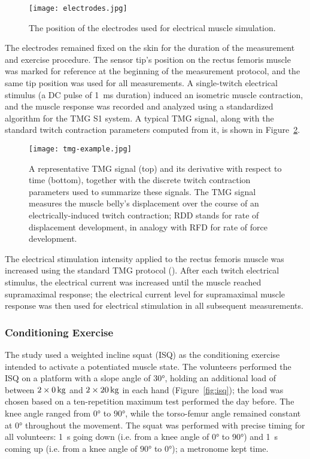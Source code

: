 \documentclass[utf8]{FrontiersinHarvard}
\begin{document}
\begin{figure}
	\centering
    \texttt{[image: electrodes.jpg]}
    \caption{The position of the electrodes used for electrical muscle simulation.}
    \label{fig:electrodes}
\end{figure}

The electrodes remained fixed on the skin for the duration of the measurement and exercise procedure.
The sensor tip's position on the rectus femoris muscle was marked for reference at the beginning of the measurement protocol, and the same tip position was used for all measurements.
A single-twitch electrical stimulus (a DC pulse of \SI{1}{\milli \second} duration) induced an isometric muscle contraction,
and the muscle response was recorded and analyzed using a standardized algorithm for the TMG S1 system.
A typical TMG signal, along with the standard twitch contraction parameters computed from it, is shown in Figure~\ref{fig:tmg_example}.

\begin{figure}
	\centering
    \texttt{[image: tmg-example.jpg]}
    \caption{A representative TMG signal (top) and its derivative with respect to time (bottom), together with the discrete twitch contraction parameters used to summarize these signals.
    The TMG signal measures the muscle belly's displacement over the course of an electrically-induced twitch contraction;
    RDD stands for rate of displacement development, in analogy with RFD for rate of force development.}
    \label{fig:tmg_example}
\end{figure}

The electrical stimulation intensity applied to the rectus femoris muscle was increased using the standard TMG protocol (\cite{valencic, dahmane-fiber, dahmane-measurement}).
After each twitch electrical stimulus, the electrical current was increased until the muscle reached supramaximal response;
the electrical current level for supramaximal muscle response was then used for electrical stimulation in all subsequent measurements.

\subsubsection{Conditioning Exercise}
The study used a weighted incline squat (ISQ) as the conditioning exercise intended to activate a potentiated muscle state. 
The volunteers performed the ISQ on a platform with a slope angle of $ \ang{30} $, holding an additional load of between $ \SI[parse-numbers = false, mode = match]{2 \times 0}{\kilogram} $ and $ \SI[parse-numbers = false, mode = match]{2 \times 20}{\kilogram} $ in each hand (Figure~\ref{fig:isq});
the load was chosen based on a ten-repetition maximum test performed the day before.
The knee angle ranged from $ \ang{0} $ to $ \ang{90} $, while the torso-femur angle remained constant at $ \ang{0} $ throughout the movement.
The squat was performed with precise timing for all volunteers: \SI{1}{\second} going down (i.e. from a knee angle of $ \ang{0} $ to $ \ang{90} $) and \SI{1}{\second} coming up (i.e. from a knee angle of $ \ang{90} $ to $ \ang{0} $); a metronome kept time.
\end{document}
